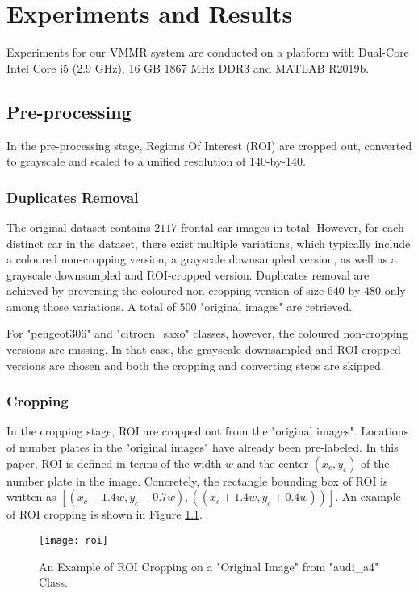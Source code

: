 \chapter{Experiments and Results}
\label{chap:experiments}

Experiments for our VMMR system are conducted on a platform with Dual-Core Intel Core i5 (2.9 GHz), 16 GB 1867 MHz DDR3 and MATLAB R2019b.

\section{Pre-processing}
\label{sec:pre-processing}
In the pre-processing stage, Regions Of Interest (ROI) are cropped out, converted to grayscale and scaled to a unified resolution of 140-by-140.

\subsection{Duplicates Removal}
The original dataset contains $2117$ frontal car images in total. 
However, for each distinct car in the dataset, there exist multiple variations, which typically include a coloured non-cropping version, a grayscale downsampled version, as well as a grayscale downsampled and ROI-cropped version.
Duplicates removal are achieved by preversing the coloured non-cropping version of size 640-by-480 only among those variations.
A total of $500$ "original images" are retrieved.

For "peugeot306" and "citroen\_saxo" classes, however, the coloured non-cropping versions are missing.
In that case, the grayscale downsampled and ROI-cropped versions are chosen and both the cropping and converting steps are skipped.


\subsection{Cropping}
In the cropping stage, ROI are cropped out from the "original images".
Locations of number plates in the "original images" have already been pre-labeled.
In this paper, ROI is defined in terms of the width $w$ and the center $(x_c, y_c)$ of the number plate in the image.
Concretely, the rectangle bounding box of ROI is written as $[(x_c-1.4w, y_c-0.7w), ((x_c+1.4w, y_c+0.4w))]$.
An example of ROI cropping is shown in Figure \ref{fig:roi}.

\begin{figure}
\centering
\texttt{[image: roi]}
\caption{An Example of ROI Cropping on a "Original Image" from "audi\_a4" Class.}
\label{fig:roi}
\end{figure}


